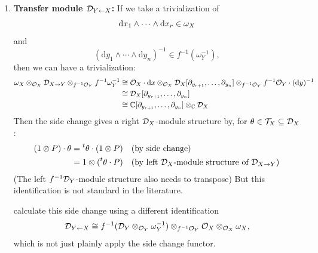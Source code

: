 \begin{example}
\begin{enumerate}
        \item \textbf{Transfer module $\mathcal{D}_{Y\leftarrow X}$:}
              If we take a trivialization of
              \[
                  \text{d}x_1 \wedge \cdots \wedge \text{d}x_r \in \omega_X
              \]
              and
              \[
                  (\text{d}y_1 \wedge \cdots \wedge \text{d}y_n)^{-1} \in f^{-1}(\omega_Y^{-1}),
              \]
              then we can have a trivialization:
              \begin{align*}
                  \omega_X \otimes_{\mathcal O_X} \mathcal{D}_{X \to Y} \otimes_{f^{-1}\mathcal O_Y} f^{-1}\omega_Y^{-1}
                   & \cong \mathcal{O}_X\cdot \text{d}x \otimes_{\mathcal{O}_X} \mathcal{D}_{X}[\partial_{y_{r+1}}, \dots, \partial_{y_n}] \otimes_{f^{-1}\mathcal{O}_Y} f^{-1}\mathcal{O}_Y\cdot (\text{d}y)^{-1} \\
                   & \cong \mathcal{D}_X[\partial_{y_{r+1}}, \dots, \partial_{y_n}]                                                                                                                       \\
                   & \cong \mathbb{C}[\partial_{y_{r+1}}, \dots, \partial_{y_n}] \otimes_{\mathbb{C}} \mathcal{D}_{X}
              \end{align*}
              Then the side change gives a right $\mathcal{D}_X$-module structure by, for $\theta \in \mathcal{T}_X \subseteq \mathcal{D}_X$:
              \begin{align*}
                  (1\otimes P)\cdot \theta & = \prescript{t}{}{\theta} \cdot (1\otimes P)  &  & \text{(by side change)}                                   \\
                                           & =  1\otimes (\prescript{t}{}{\theta} \cdot P) &  & \text{(by left $\mathcal{D}_X$-module structure of $\mathcal{D}_{X\to Y}$)}
              \end{align*}
              (The left $f^{-1}\mathcal{D}_Y$-module structure also needs to transpose) But this identification is not standard in the literature.

              \cite{hotta2008d} calculate this side change using a different identification \cite[Lemma~1.3.4]{hotta2008d}
              \[
                  \mathcal{D}_{Y\leftarrow X} \cong f^{-1} (\mathcal{D}_Y \otimes_{\mathcal O_Y} \omega_Y^{-1}) \otimes_{f^{-1}\mathcal O_Y} \mathcal O_X \otimes_{\mathcal O_X} \omega_X,
              \]
              which is not just plainly apply the side change functor.


\end{enumerate}
\end{example}
